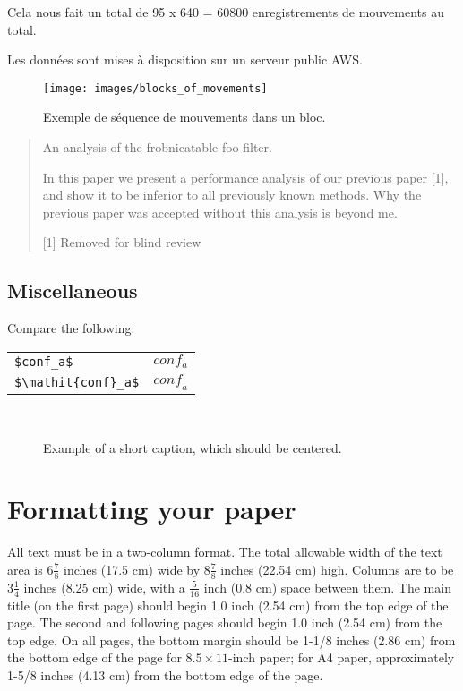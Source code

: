 \documentclass[10pt,twocolumn,letterpaper]{article}
\begin{document}
Cela nous fait un total de 95 x 640 = 60800 enregistrements de mouvements au total.


Les données sont mises à disposition sur un serveur public AWS.

\begin{figure*}
\texttt{[image: images/blocks\_of\_movements]}
	\caption{Exemple de séquence de mouvements dans un bloc.}
\label{fig:long}
\label{fig:onecol}
\end{figure*}


\begin{quote}
\begin{center}
    An analysis of the frobnicatable foo filter.
\end{center}

   In this paper we present a performance analysis of our
   previous paper [1], and show it to be inferior to all
   previously known methods.  Why the previous paper was
   accepted without this analysis is beyond me.

   [1] Removed for blind review
\end{quote}


\subsection{Miscellaneous}

\noindent
Compare the following:\\
\begin{tabular}{ll}
 \verb'$conf_a$' &  $conf_a$ \\
 \verb'$\mathit{conf}_a$' & $\mathit{conf}_a$
\end{tabular}\\


\begin{figure*}
\begin{center}
\fbox{\rule{0pt}{2in} \rule{.9\linewidth}{0pt}}
\end{center}
   \caption{Example of a short caption, which should be centered.}
\label{fig:short}
\end{figure*}

\section{Formatting your paper}

All text must be in a two-column format. The total allowable width of the
text area is $6\frac78$ inches (17.5 cm) wide by $8\frac78$ inches (22.54
cm) high. Columns are to be $3\frac14$ inches (8.25 cm) wide, with a
$\frac{5}{16}$ inch (0.8 cm) space between them. The main title (on the
first page) should begin 1.0 inch (2.54 cm) from the top edge of the
page. The second and following pages should begin 1.0 inch (2.54 cm) from
the top edge. On all pages, the bottom margin should be 1-1/8 inches (2.86
cm) from the bottom edge of the page for $8.5 \times 11$-inch paper; for A4
paper, approximately 1-5/8 inches (4.13 cm) from the bottom edge of the
page.
\end{document}
